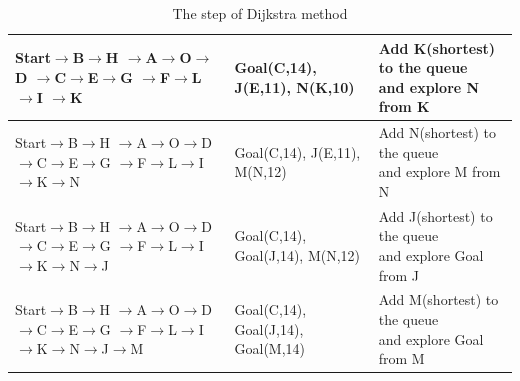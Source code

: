 \documentclass{article}
\begin{document}
\begin{table}[H]
\begin{tabular}{l|l|l}
            \makecell*[c]{Start$\rightarrow$B$\rightarrow$H\\$\rightarrow$A$\rightarrow$O$\rightarrow$D\\$\rightarrow$C$\rightarrow$E$\rightarrow$G\\$\rightarrow$F$\rightarrow$L$\rightarrow$I\\$\rightarrow$\textcolor[rgb]{0,0,1}{K}}       & Goal(C,14), \textcolor[rgb]{0,1,0}{J(E,11)}, \textcolor[rgb]{0,0,1}{N(K,10)}                           & \makecell*[c]{Add K(shortest) to the queue\\ and explore N from K}          \\ \hline
            \makecell*[c]{Start$\rightarrow$B$\rightarrow$H\\$\rightarrow$A$\rightarrow$O$\rightarrow$D\\$\rightarrow$C$\rightarrow$E$\rightarrow$G\\$\rightarrow$F$\rightarrow$L$\rightarrow$I\\$\rightarrow$K$\rightarrow$\textcolor[rgb]{0,0,1}{N}}     & Goal(C,14), \textcolor[rgb]{0,1,0}{J(E,11)}, M(N,12)                           & \makecell*[c]{Add N(shortest) to the queue\\ and explore M from N }         \\ \hline
            \makecell*[c]{Start$\rightarrow$B$\rightarrow$H\\$\rightarrow$A$\rightarrow$O$\rightarrow$D\\$\rightarrow$C$\rightarrow$E$\rightarrow$G\\$\rightarrow$F$\rightarrow$L$\rightarrow$I\\$\rightarrow$K$\rightarrow$N$\rightarrow$\textcolor[rgb]{0,1,0}{J}}   & Goal(C,14), Goal(J,14), \textcolor[rgb]{0,0,1}{M(N,12)}                        & \makecell*[c]{Add J(shortest) to the queue\\ and explore Goal from J}       \\ \hline
            \makecell*[c]{Start$\rightarrow$B$\rightarrow$H\\$\rightarrow$A$\rightarrow$O$\rightarrow$D\\$\rightarrow$C$\rightarrow$E$\rightarrow$G\\$\rightarrow$F$\rightarrow$L$\rightarrow$I\\$\rightarrow$K$\rightarrow$N$\rightarrow$J$\rightarrow$\textcolor[rgb]{0,0,1}{M}} & \textcolor[rgb]{1,0,0}{Goal(C,14)}, \textcolor[rgb]{0,1,0}{Goal(J,14)}, \textcolor[rgb]{0,0,1}{Goal(M,14)}                     & \makecell*[c]{Add M(shortest) to the queue\\ and explore Goal from M}      
            \end{tabular}
            \caption{The step of Dijkstra method}
            \end{table}
\end{document}
